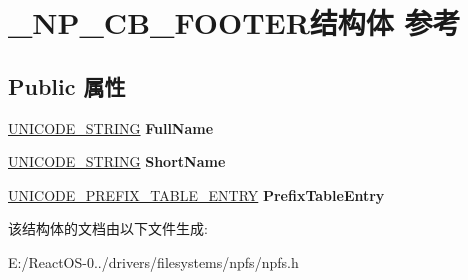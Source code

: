 \hypertarget{struct___n_p___c_b___f_o_o_t_e_r}{}\section{\+\_\+\+N\+P\+\_\+\+C\+B\+\_\+\+F\+O\+O\+T\+E\+R结构体 参考}
\label{struct___n_p___c_b___f_o_o_t_e_r}
\subsection*{Public 属性}
\begin{DoxyCompactItemize}
\item 
\mbox{\label{struct___n_p___c_b___f_o_o_t_e_r_a41e3b6e0cf2fed4faa6f7830c65daf29}} 
\hyperlink{struct___u_n_i_c_o_d_e___s_t_r_i_n_g}{U\+N\+I\+C\+O\+D\+E\+\_\+\+S\+T\+R\+I\+NG} {\bfseries Full\+Name}
\item 
\mbox{\label{struct___n_p___c_b___f_o_o_t_e_r_a03b2cf498ef8ef7b21f0ab6f19a67db4}} 
\hyperlink{struct___u_n_i_c_o_d_e___s_t_r_i_n_g}{U\+N\+I\+C\+O\+D\+E\+\_\+\+S\+T\+R\+I\+NG} {\bfseries Short\+Name}
\item 
\mbox{\label{struct___n_p___c_b___f_o_o_t_e_r_a40bdf2c3d031b17959fcb2145f115aff}} 
\hyperlink{struct___u_n_i_c_o_d_e___p_r_e_f_i_x___t_a_b_l_e___e_n_t_r_y}{U\+N\+I\+C\+O\+D\+E\+\_\+\+P\+R\+E\+F\+I\+X\+\_\+\+T\+A\+B\+L\+E\+\_\+\+E\+N\+T\+RY} {\bfseries Prefix\+Table\+Entry}
\end{DoxyCompactItemize}


该结构体的文档由以下文件生成\+:\begin{DoxyCompactItemize}
\item 
E\+:/\+React\+O\+S-\/0../drivers/filesystems/npfs/npfs.\+h\end{DoxyCompactItemize}
